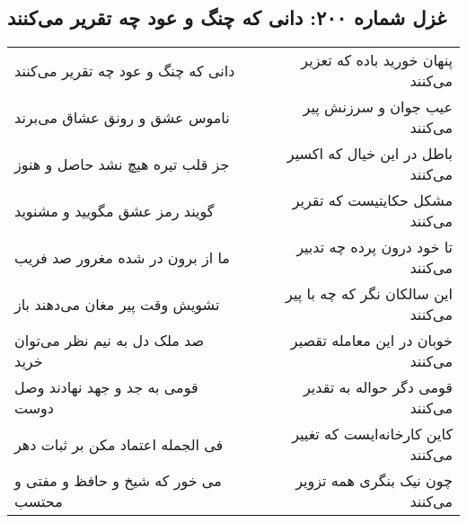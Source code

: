 \begin{center}
\section*{غزل شماره ۲۰۰: دانی که چنگ و عود چه تقریر می‌کنند}
\label{sec:sh200}
\begin{longtable}{l p{0.5cm} r}
دانی که چنگ و عود چه تقریر می‌کنند
&&
پنهان خورید باده که تعزیر می‌کنند
\\
ناموس عشق و رونق عشاق می‌برند
&&
عیب جوان و سرزنش پیر می‌کنند
\\
جز قلب تیره هیچ نشد حاصل و هنوز
&&
باطل در این خیال که اکسیر می‌کنند
\\
گویند رمز عشق مگویید و مشنوید
&&
مشکل حکایتیست که تقریر می‌کنند
\\
ما از برون در شده مغرور صد فریب
&&
تا خود درون پرده چه تدبیر می‌کنند
\\
تشویش وقت پیر مغان می‌دهند باز
&&
این سالکان نگر که چه با پیر می‌کنند
\\
صد ملک دل به نیم نظر می‌توان خرید
&&
خوبان در این معامله تقصیر می‌کنند
\\
قومی به جد و جهد نهادند وصل دوست
&&
قومی دگر حواله به تقدیر می‌کنند
\\
فی الجمله اعتماد مکن بر ثبات دهر
&&
کاین کارخانه‌ایست که تغییر می‌کنند
\\
می خور که شیخ و حافظ و مفتی و محتسب
&&
چون نیک بنگری همه تزویر می‌کنند
\\
\end{longtable}
\end{center}
